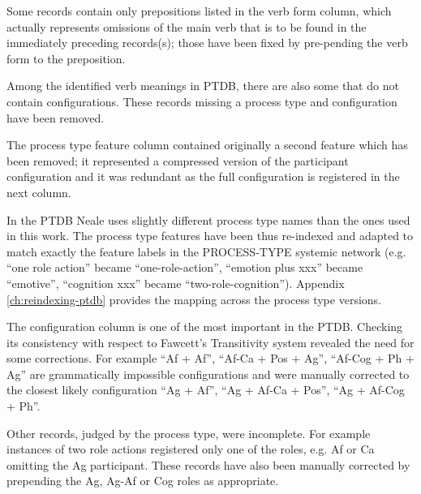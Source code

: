     Some records contain only prepositions listed in the verb form column, which actually represents omissions of the main verb that is to be found in the immediately preceding records(s); those have been fixed by pre-pending the verb form to the preposition. 


    Among the identified verb meanings in PTDB, there are also some that do not contain configurations. These records missing a process type and configuration have been removed. 

    The process type feature column contained originally a second feature which has been removed; it represented a compressed version of the participant configuration and it was redundant as the full configuration is registered in the next column. 

    In the PTDB Neale uses slightly different process type names than the ones used in this work. The process type features have been thus re-indexed and adapted to match exactly the feature labels in the PROCESS-TYPE systemic network (e.g. ``one role action'' became ``one-role-action'', ``emotion plus xxx'' became ``emotive'', ``cognition xxx'' became ``two-role-cognition''). Appendix \ref{ch:reindexing-ptdb} provides the mapping across the process type versions. 

    The configuration column is one of the most important in the PTDB. Checking its consistency with respect to Fawcett's Transitivity system revealed the need for some corrections. For example ``Af + Af'', ``Af-Ca + Pos + Ag'', ``Af-Cog + Ph + Ag'' are grammatically impossible configurations and were manually corrected to the closest likely configuration ``Ag + Af'', ``Ag + Af-Ca + Pos'', ``Ag + Af-Cog + Ph''.

    Other records, judged by the process type, were incomplete. For example instances of two role actions registered only one of the roles, e.g. Af or Ca omitting the Ag participant. These records have also been manually corrected by prepending the Ag, Ag-Af or Cog roles as appropriate. 


